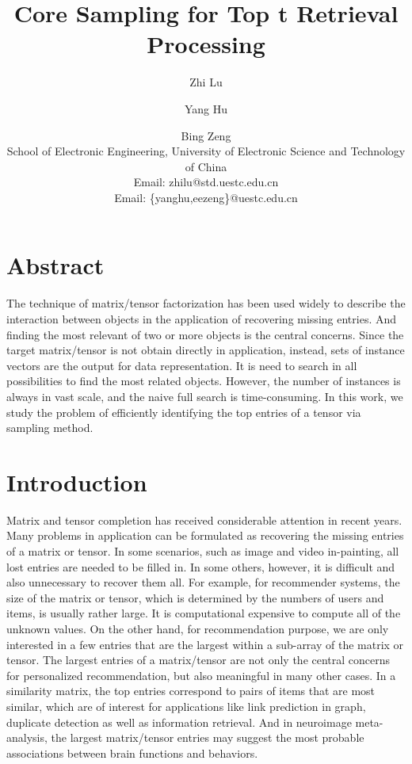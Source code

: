 \documentclass[letterpaper]{article}
\title{Core Sampling for Top t Retrieval Processing}
\author{Zhi Lu \and Yang Hu \and Bing Zeng\\
School of Electronic Engineering, University of Electronic Science and Technology of China\\
Email: zhilu@std.uestc.edu.cn\\
Email: \{yanghu,eezeng\}@uestc.edu.cn
}
\begin{document}
\maketitle
\section{Abstract}
The technique of matrix/tensor factorization has been used widely to describe the 
interaction between objects in the application of recovering missing entries.
And finding the most relevant of two or more objects is the central concerns.
Since the target matrix/tensor is not obtain directly in application, instead,
sets of instance vectors are the output for data representation.
It is need to search in all possibilities to find the most related objects.
However, the number of instances is always in vast scale, 
and the naive full search is time-consuming.
In this work, we study the problem of efficiently
identifying the top entries of a tensor via sampling method.


\section{Introduction}
Matrix and tensor completion has received considerable attention in recent years. 
Many problems in application can be formulated as recovering the missing entries of a matrix or tensor. 
In some scenarios, such as image and video in-painting, 
all lost entries are needed to be filled in. 
In some others, however, it is difficult and also unnecessary to recover them all. 
For example, for recommender systems, the size of the matrix or tensor, 
which is determined by the numbers of users and items, is usually rather large. 
It is computational expensive to compute all of the unknown values. 
On the other hand, for recommendation purpose, 
we are only interested in a few entries that are the largest within a sub-array of the matrix or tensor. 
The largest entries of a matrix/tensor are not only the central concerns for personalized recommendation, 
but also meaningful in many other cases. 
In a similarity matrix, the top entries correspond to pairs of items that are most similar, 
which are of interest for applications like link prediction in graph, 
duplicate detection as well as information retrieval. 
And in neuroimage meta-analysis, 
the largest matrix/tensor entries may suggest the most probable associations between brain functions and behaviors.
\end{document}
